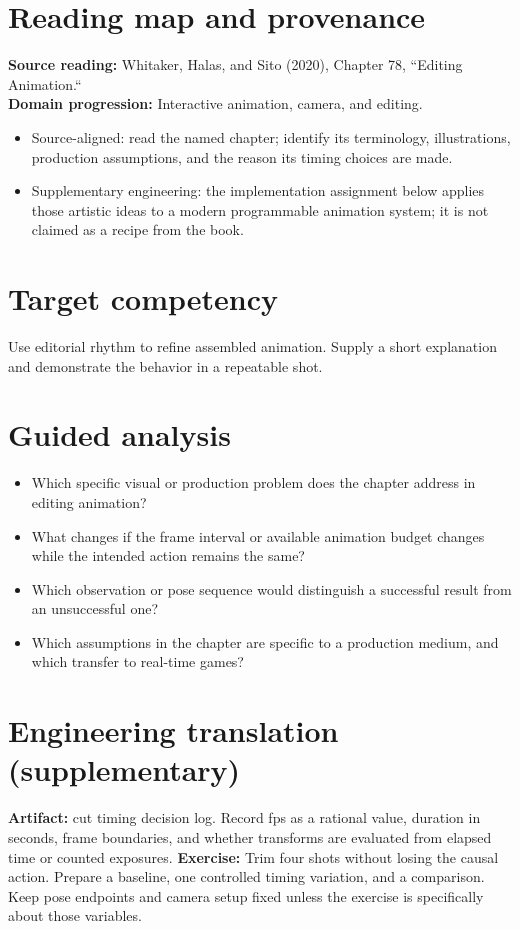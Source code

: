 \documentclass[10pt,letterpaper]{article}
\begin{document}
\makedoctitle
\makedocsummary

\section{Reading map and provenance}
\textbf{Source reading:} Whitaker, Halas, and Sito (2020), Chapter 78, ``Editing Animation.``\\
\textbf{Domain progression:} Interactive animation, camera, and editing.
\begin{itemize}
\item Source-aligned: read the named chapter; identify its terminology, illustrations, production assumptions, and the reason its timing choices are made.
\item Supplementary engineering: the implementation assignment below applies those artistic ideas to a modern programmable animation system; it is not claimed as a recipe from the book.
\end{itemize}
\section{Target competency}
Use editorial rhythm to refine assembled animation. Supply a short explanation and demonstrate the behavior in a repeatable shot.
\section{Guided analysis}
\begin{itemize}
\item Which specific visual or production problem does the chapter address in editing animation?
\item What changes if the frame interval or available animation budget changes while the intended action remains the same?
\item Which observation or pose sequence would distinguish a successful result from an unsuccessful one?
\item Which assumptions in the chapter are specific to a production medium, and which transfer to real-time games?
\end{itemize}
\section{Engineering translation (supplementary)}
\textbf{Artifact:} cut timing decision log. Record fps as a rational value, duration in seconds, frame boundaries, and whether transforms are evaluated from elapsed time or counted exposures.
\textbf{Exercise:} Trim four shots without losing the causal action. Prepare a baseline, one controlled timing variation, and a comparison. Keep pose endpoints and camera setup fixed unless the exercise is specifically about those variables.
\end{document}
